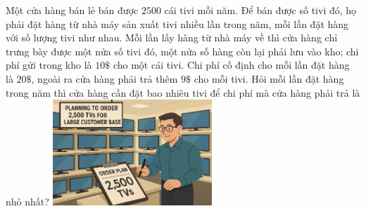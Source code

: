  \begin{ex}%
\immini
{
    Một cửa hàng bán lẻ bán được $ 2500$ cái tivi mỗi năm. Để bán được số tivi đó, họ phải đặt hàng từ nhà máy sản xuất tivi nhiều lần trong năm, mỗi lần đặt hàng với số lượng tivi như nhau. Mỗi lần lấy hàng từ nhà máy về thì cửa hàng chỉ trưng bày được một nửa số tivi đó, một nửa số hàng còn lại phải lưu vào kho; chi phí gửi trong kho là $ 10\$$ cho một cái tivi. Chi phí cố định cho mỗi lần đặt hàng là $ 20\$$, ngoài ra cửa hàng phải trả thêm $ 9\$$ cho mỗi tivi. Hỏi mỗi lần đặt hàng trong năm thì cửa hàng cần đặt bao nhiêu tivi để chi phí mà cửa hàng phải trả là nhỏ nhất?
}
{
    \includegraphics[width=6cm]{img/HXN-13-18}
}
\end{ex}
